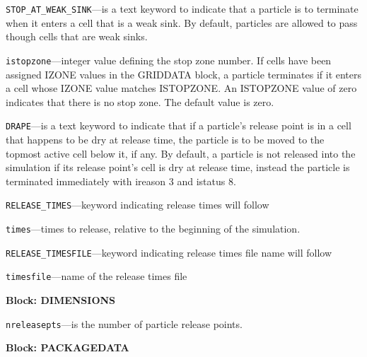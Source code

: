 \begin{description}
\item \texttt{STOP\_AT\_WEAK\_SINK}---is a text keyword to indicate that a particle is to terminate when it enters a cell that is a weak sink.  By default, particles are allowed to pass though cells that are weak sinks.

\item \texttt{istopzone}---integer value defining the stop zone number.  If cells have been assigned IZONE values in the GRIDDATA block, a particle terminates if it enters a cell whose IZONE value matches ISTOPZONE.  An ISTOPZONE value of zero indicates that there is no stop zone.  The default value is zero.

\item \texttt{DRAPE}---is a text keyword to indicate that if a particle's release point is in a cell that happens to be dry at release time, the particle is to be moved to the topmost active cell below it, if any. By default, a particle is not released into the simulation if its release point's cell is dry at release time, instead the particle is terminated immediately with ireason 3 and istatus 8.

\item \texttt{RELEASE\_TIMES}---keyword indicating release times will follow

\item \texttt{times}---times to release, relative to the beginning of the simulation.

\item \texttt{RELEASE\_TIMESFILE}---keyword indicating release times file name will follow

\item \texttt{timesfile}---name of the release times file

\end{description}
\item \textbf{Block: DIMENSIONS}

\begin{description}
\item \texttt{nreleasepts}---is the number of particle release points.

\end{description}
\item \textbf{Block: PACKAGEDATA}


